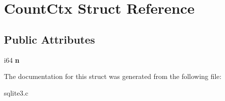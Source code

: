 \hypertarget{structCountCtx}{}\section{Count\+Ctx Struct Reference}
\label{structCountCtx}
\subsection*{Public Attributes}
\begin{DoxyCompactItemize}
\item 
i64 {\bfseries n}\hypertarget{structCountCtx_a141c718918dbfaa183f772bfd7a516f4}{}\label{structCountCtx_a141c718918dbfaa183f772bfd7a516f4}

\end{DoxyCompactItemize}


The documentation for this struct was generated from the following file\+:\begin{DoxyCompactItemize}
\item 
sqlite3.\+c\end{DoxyCompactItemize}
